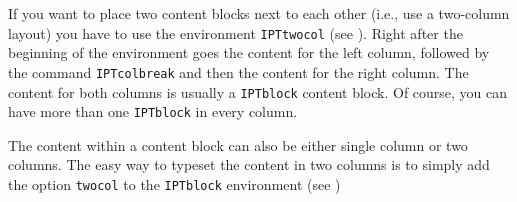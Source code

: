 

If you want to place two content blocks next to each other (i.e., use a two-column layout) you have to use the environment \texttt{IPTtwocol} (see ). Right after the beginning of the environment goes the content for the left column, followed by the command \texttt{\bs{}IPTcolbreak} and then the content for the right column. The content for both columns is usually a \texttt{IPTblock} content block. Of course, you can have more than one \texttt{IPTblock} in every column.







The content within a content block can also be either single column or two columns. The easy way to typeset the content in two columns is to simply add the option \texttt{twocol} to the \texttt{IPTblock} environment (see )


